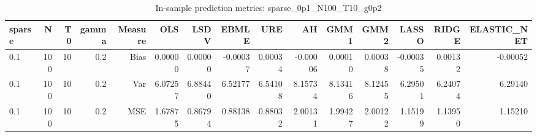 \begin{table}[!htbp]\centering
\caption{In-sample prediction metrics: sparse_0p1_N100_T10_g0p2}
\label{tab:table2_sparse_0p1_N100_T10_g0p2}
\begin{tabular}{lrrrrrrrrrrrrrr}
\hline
sparse & N & T0 & gamma & Measure & OLS & LSDV & EBMLE & URE & AH & GMM1 & GMM2 & LASSO & RIDGE & ELASTIC_NET \\
\hline
0.1 & 100 & 10 & 0.2 & Bias & 0.00000 & 0.00000 & -0.00037 & 0.00034 & -0.00006 & 0.00010 & 0.00038 & -0.00035 & 0.00132 & -0.00052 \\
0.1 & 100 & 10 & 0.2 & Var & 6.07257 & 6.88440 & 6.52177 & 6.54108 & 8.15734 & 8.13416 & 8.12455 & 6.29501 & 6.24074 & 6.29140 \\
0.1 & 100 & 10 & 0.2 & MSE & 1.67875 & 0.86794 & 0.88138 & 0.88032 & 2.00131 & 1.99427 & 2.00122 & 1.15199 & 1.13950 & 1.15210 \\
\hline
\end{tabular}
\end{table}

